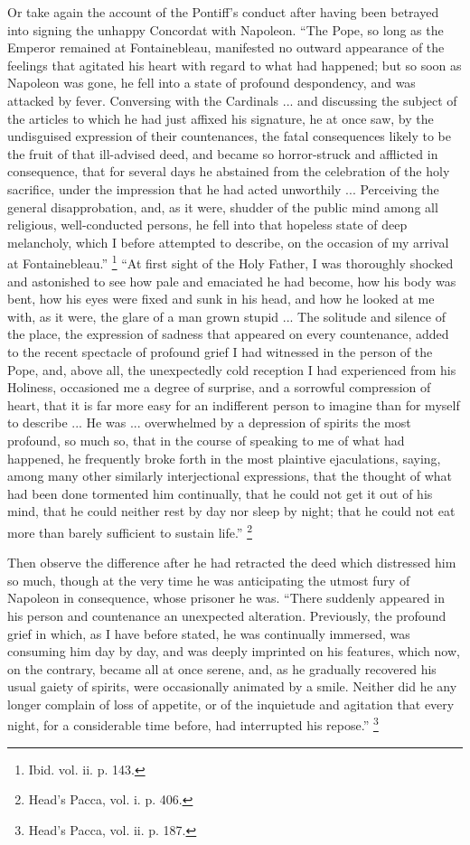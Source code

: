 Or take again the account of the Pontiff's conduct
after having been betrayed into signing the unhappy
Concordat with Napoleon. ``The Pope, so long as the
Emperor remained at Fontainebleau, manifested no outward
appearance of the feelings that agitated his heart with
regard to what had happened; but so soon as Napoleon was
gone, he fell into a state of profound despondency, and
was attacked by fever. Conversing with the Cardinals ...
and discussing the subject of the articles to which he
had just affixed his signature, he at once saw, by the
undisguised expression of their countenances, the fatal
consequences likely to be the fruit of that ill-advised
deed, and became so horror-struck and afflicted in
consequence, that for several days he abstained from the
celebration of the holy sacrifice, under the impression
that he had acted unworthily ... Perceiving the general
disapprobation, and, as it were, shudder of the public
mind among all religious, well-conducted persons, he fell
into that hopeless state of deep melancholy, which I
before attempted to describe, on the occasion of my
arrival at Fontainebleau.'' \footnote{Ibid. vol. ii. p. 143.} ``At first sight of the
Holy Father, I was thoroughly shocked and astonished to
see how pale and emaciated he had become, how his body
was bent, how his eyes were fixed and sunk in his head,
and how he looked at me with, as it were, the glare of a
man grown stupid ... The solitude and silence of the
place, the expression of sadness that appeared on every
countenance, added to the recent spectacle of profound
grief I had witnessed in the person of the Pope, and,
above all, the unexpectedly cold reception I had
experienced from his Holiness, occasioned me a degree of
surprise, and a sorrowful compression of heart, that it
is far more easy for an indifferent person to imagine
than for myself to describe ... He was ... overwhelmed by
a depression of spirits the most profound, so much so,
that in the course of speaking to me of what had
happened, he frequently broke forth in the most plaintive
ejaculations, saying, among many other similarly
interjectional expressions, that the thought of what had
been done tormented him continually, that he could not
get it out of his mind, that he could neither rest by day
nor sleep by night; that he could not eat more than
barely sufficient to sustain life.'' \footnote{Head's Pacca, vol. i. p. 406.}

Then observe the difference after he had retracted the
deed which distressed him so much, though at the very
time he was anticipating the utmost fury of Napoleon in
consequence, whose prisoner he was. ``There suddenly
appeared in his person and countenance an unexpected
alteration. Previously, the profound grief in which, as I
have before stated, he was continually immersed, was
consuming him day by day, and was deeply imprinted on his
features, which now, on the contrary, became all at once
serene, and, as he gradually recovered his usual gaiety
of spirits, were occasionally animated by a smile.
Neither did he any longer complain of loss of appetite, or of the inquietude and agitation that every night, for
a considerable time before, had interrupted his
repose.'' \footnote{Head's Pacca, vol. ii. p. 187.}

